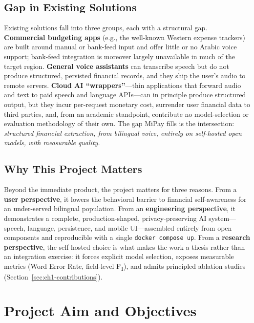 \subsection{Gap in Existing Solutions}

Existing solutions fall into three groups, each with a structural gap.
\textbf{Commercial budgeting apps} (e.g., the well-known Western expense
trackers) are built around manual or bank-feed input and offer little or no
Arabic voice support; bank-feed integration is moreover largely unavailable in
much of the target region. \textbf{General voice assistants} can transcribe
speech but do not produce structured, persisted financial records, and they ship
the user's audio to remote servers. \textbf{Cloud AI ``wrappers''}---thin
applications that forward audio and text to paid speech and language APIs---can
in principle produce structured output, but they incur per-request monetary cost,
surrender user financial data to third parties, and, from an academic standpoint,
contribute no model-selection or evaluation methodology of their own. The gap
MiPay fills is the intersection: \emph{structured financial extraction, from
bilingual voice, entirely on self-hosted open models, with measurable quality.}

\subsection{Why This Project Matters}

Beyond the immediate product, the project matters for three reasons. From a
\textbf{user perspective}, it lowers the behavioral barrier to financial
self-awareness for an under-served bilingual population. From an
\textbf{engineering perspective}, it demonstrates a complete,
production-shaped, privacy-preserving AI system---speech, language, persistence,
and mobile UI---assembled entirely from open components and reproducible with a
single \texttt{docker compose up}. From a \textbf{research perspective}, the
self-hosted choice is what makes the work a thesis rather than an integration
exercise: it forces explicit model selection, exposes measurable metrics (Word
Error Rate, field-level F\textsubscript{1}), and admits principled ablation
studies (Section~\ref{sec:ch1-contributions}).

\section{Project Aim and Objectives}


